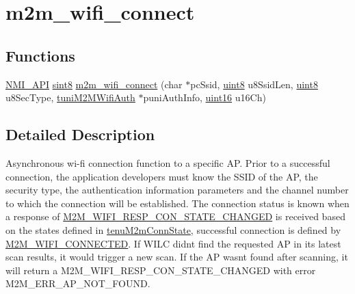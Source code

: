 \hypertarget{group__WifiConnectFn}{}\section{m2m\+\_\+wifi\+\_\+connect}
\label{group__WifiConnectFn}
\subsection*{Functions}
\begin{DoxyCompactItemize}
\item 
\hyperlink{group__BSPDefine_gaecc0323d771e41ef81a76b5f12783e22}{N\+M\+I\+\_\+\+A\+PI} \hyperlink{group__DataT_gae35f10ffd0ac8dd2bc3e794da9bdfbc7}{sint8} \hyperlink{group__WifiConnectFn_ga19c9871147efe70f5d9c2cc2cdd5bff0}{m2m\+\_\+wifi\+\_\+connect} (char $\ast$pc\+Ssid, \hyperlink{group__DataT_ga4df709a77647e870bbf1d955b8edc9a6}{uint8} u8\+Ssid\+Len, \hyperlink{group__DataT_ga4df709a77647e870bbf1d955b8edc9a6}{uint8} u8\+Sec\+Type, \hyperlink{uniontuniM2MWifiAuth}{tuni\+M2\+M\+Wifi\+Auth} $\ast$puni\+Auth\+Info, \hyperlink{group__DataT_ga1daa745171fc6e31d942c161422a76f9}{uint16} u16\+Ch)
\end{DoxyCompactItemize}


\subsection{Detailed Description}
Asynchronous wi-\/fi connection function to a specific AP. Prior to a successful connection, the application developers must know the S\+S\+ID of the AP, the security type, the authentication information parameters and the channel number to which the connection will be established. The connection status is known when a response of \hyperlink{group__WlanEnums_gga064de09dec1d5e88ed8d075fa40f57deabb42b3025c56c51d915a1fa4abd2dbd0}{M2\+M\+\_\+\+W\+I\+F\+I\+\_\+\+R\+E\+S\+P\+\_\+\+C\+O\+N\+\_\+\+S\+T\+A\+T\+E\+\_\+\+C\+H\+A\+N\+G\+ED} is received based on the states defined in \hyperlink{group__WlanEnums_ga460c311f58f4c40c3d20eec9e99db586}{tenu\+M2m\+Conn\+State}, successful connection is defined by \hyperlink{group__WlanEnums_gga460c311f58f4c40c3d20eec9e99db586a9196649c19ee10e2168e08a5b4785938}{M2\+M\+\_\+\+W\+I\+F\+I\+\_\+\+C\+O\+N\+N\+E\+C\+T\+ED}. If W\+I\+LC didn\textquotesingle{}t find the requested AP in its latest scan results, it would trigger a new scan. If the AP wasn\textquotesingle{}t found after scanning, it will return a M2\+M\+\_\+\+W\+I\+F\+I\+\_\+\+R\+E\+S\+P\+\_\+\+C\+O\+N\+\_\+\+S\+T\+A\+T\+E\+\_\+\+C\+H\+A\+N\+G\+ED with error M2\+M\+\_\+\+E\+R\+R\+\_\+\+A\+P\+\_\+\+N\+O\+T\+\_\+\+F\+O\+U\+ND. 

